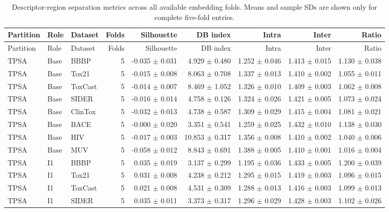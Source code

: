 \documentclass[journal=jcisd8,manuscript=article]{achemso}
\begin{document}
\begin{landscape}
\begin{longtable}{lllrrrrrr}
\caption{Descriptor-region separation metrics across all available embedding folds. Means and sample SDs are shown only for complete five-fold entries.}
\label{tab:si-embedding-all}\\
\toprule
Partition & Role & Dataset & Folds & Silhouette & DB index & Intra & Inter & Ratio \\
\midrule
\endfirsthead
\toprule
Partition & Role & Dataset & Folds & Silhouette & DB index & Intra & Inter & Ratio \\
\midrule
\endhead
TPSA & Base & BBBP & 5 & -0.035 $\pm$ 0.031 & 4.929 $\pm$ 0.480 & 1.252 $\pm$ 0.046 & 1.413 $\pm$ 0.015 & 1.130 $\pm$ 0.038 \\
TPSA & Base & Tox21 & 5 & -0.015 $\pm$ 0.008 & 8.063 $\pm$ 0.708 & 1.337 $\pm$ 0.013 & 1.410 $\pm$ 0.002 & 1.055 $\pm$ 0.011 \\
TPSA & Base & ToxCast & 5 & -0.014 $\pm$ 0.007 & 8.469 $\pm$ 1.052 & 1.326 $\pm$ 0.010 & 1.409 $\pm$ 0.003 & 1.062 $\pm$ 0.008 \\
TPSA & Base & SIDER & 5 & -0.016 $\pm$ 0.014 & 4.758 $\pm$ 0.126 & 1.324 $\pm$ 0.026 & 1.421 $\pm$ 0.005 & 1.073 $\pm$ 0.024 \\
TPSA & Base & ClinTox & 5 & -0.032 $\pm$ 0.013 & 4.738 $\pm$ 0.587 & 1.309 $\pm$ 0.029 & 1.415 $\pm$ 0.004 & 1.081 $\pm$ 0.021 \\
TPSA & Base & BACE & 5 & -0.000 $\pm$ 0.020 & 3.351 $\pm$ 0.541 & 1.259 $\pm$ 0.025 & 1.432 $\pm$ 0.010 & 1.138 $\pm$ 0.030 \\
TPSA & Base & HIV & 5 & -0.017 $\pm$ 0.003 & 10.853 $\pm$ 0.317 & 1.356 $\pm$ 0.008 & 1.410 $\pm$ 0.002 & 1.040 $\pm$ 0.006 \\
TPSA & Base & MUV & 5 & -0.058 $\pm$ 0.012 & 8.843 $\pm$ 0.691 & 1.388 $\pm$ 0.005 & 1.410 $\pm$ 0.001 & 1.016 $\pm$ 0.004 \\
TPSA & I1 & BBBP & 5 & 0.035 $\pm$ 0.019 & 3.137 $\pm$ 0.299 & 1.195 $\pm$ 0.036 & 1.433 $\pm$ 0.005 & 1.200 $\pm$ 0.039 \\
TPSA & I1 & Tox21 & 5 & 0.031 $\pm$ 0.008 & 4.238 $\pm$ 0.212 & 1.295 $\pm$ 0.015 & 1.419 $\pm$ 0.003 & 1.096 $\pm$ 0.015 \\
TPSA & I1 & ToxCast & 5 & 0.021 $\pm$ 0.008 & 4.531 $\pm$ 0.309 & 1.288 $\pm$ 0.013 & 1.416 $\pm$ 0.003 & 1.099 $\pm$ 0.013 \\
TPSA & I1 & SIDER & 5 & 0.035 $\pm$ 0.011 & 3.373 $\pm$ 0.317 & 1.296 $\pm$ 0.029 & 1.428 $\pm$ 0.003 & 1.102 $\pm$ 0.026 \\

\end{longtable}
\end{landscape}
\end{document}

